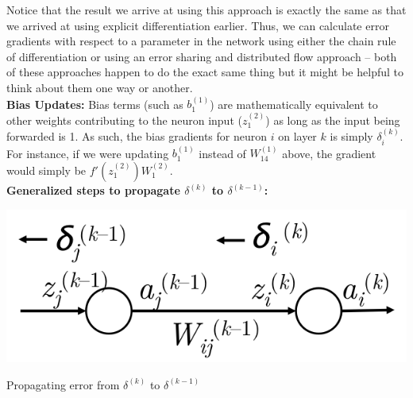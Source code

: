 \documentclass{tufte-handout}
\begin{document}
Notice that the result we arrive at using this approach is exactly the same as that we arrived at using explicit differentiation earlier. Thus, we can calculate error gradients with respect to a parameter in the network using either the chain rule of differentiation or using an error sharing and distributed flow approach -- both of these approaches happen to do the exact same thing but it might be helpful to think about them one way or another.
$$ $$
\textbf{Bias Updates:} Bias terms (such as $b^{(1)}_1$) are mathematically equivalent to other weights contributing to the neuron input ($z^{(2)}_1$) as long as the input being forwarded is 1. As such, the bias gradients for neuron $i$ on layer $k$ is simply $\delta^{(k)}_i$. For instance, if we were updating $b_1^{(1)}$ instead of $W^{(1)}_{14}$ above, the gradient would simply be $f'(z_1^{(2)}) W_{1}^{(2)}$.
$$ $$
\textbf{Generalized steps to propagate $\delta^{(k)}$ to $\delta^{(k-1)}$:} 
\begin{marginfigure}%
  \includegraphics[width=\linewidth]{ErrorSignal2}
  \caption{Propagating error from $\delta^{(k)}$ to $\delta^{(k-1)}$}
  \label{fig:ErrorSignal2}
\end{marginfigure}
\end{document}
